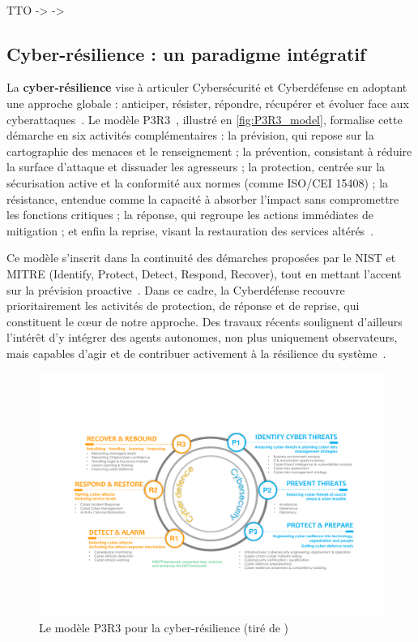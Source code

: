 \

\ac{TTO} ->  -> 

\subsection*{Cyber-résilience : un paradigme intégratif}

La \textbf{cyber-résilience} vise à articuler Cybersécurité et Cyberdéfense en adoptant une approche globale : anticiper, résister, répondre, récupérer et évoluer face aux cyberattaques~\cite{NISTresilience}. Le modèle P3R3~\cite{Theron2013P3R3}, illustré en \autoref{fig:P3R3_model}, formalise cette démarche en six activités complémentaires : la prévision, qui repose sur la cartographie des menaces et le renseignement ; la prévention, consistant à réduire la surface d'attaque et dissuader les agresseurs ; la protection, centrée sur la sécurisation active et la conformité aux normes (comme ISO/CEI 15408) ; la résistance, entendue comme la capacité à absorber l'impact sans compromettre les fonctions critiques ; la réponse, qui regroupe les actions immédiates de mitigation ; et enfin la reprise, visant la restauration des services altérés~\cite{Theron2013P3R3}.

Ce modèle s'inscrit dans la continuité des démarches proposées par le \ac{NIST} et MITRE (Identify, Protect, Detect, Respond, Recover), tout en mettant l'accent sur la prévision proactive~\cite{Theron2013P3R3}. Dans ce cadre, la Cyberdéfense recouvre prioritairement les activités de protection, de réponse et de reprise, qui constituent le cœur de notre approche. Des travaux récents soulignent d'ailleurs l'intérêt d'y intégrer des agents autonomes, non plus uniquement observateurs, mais capables d'agir et de contribuer activement à la résilience du système~\cite{Kott2023}.

\begin{figure}[h]
    \centering
    \includegraphics[width=\linewidth]{figures/P3R3.pdf}
    \caption{Le modèle P3R3 pour la cyber-résilience (tiré de \autocite{Kott2023})}
    \label{fig:P3R3_model}
\end{figure}

